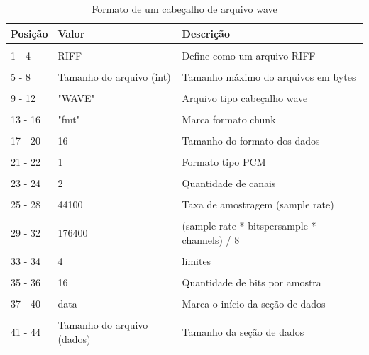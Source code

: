 \begin{table}[H]
\centering
\caption{Formato de um cabeçalho de arquivo wave}
\label{tab:app}
\smallskip
\begin{tabular}{|l|l|l|}
\hline
Posição & Valor & Descrição\\[0.5ex]
\hline
&&\\[-2ex]
1 - 4& RIFF & Define como um arquivo RIFF \\[0.5ex]
\hline
&&\\[-2ex]
5 - 8& Tamanho do arquivo (int) & Tamanho máximo do arquivos em bytes \\[0.5ex]
\hline
&&\\[-2ex]
9 - 12 & "WAVE" & Arquivo tipo cabeçalho wave\\[0.5ex]
\hline
&&\\[-2ex]
13 - 16& "fmt" & Marca formato chunk \\[0.5ex]
\hline
&&\\[-2ex]
17 - 20& 16& Tamanho do formato dos dados \\[0.5ex]
\hline
&&\\[-2ex]
21 - 22& 1& Formato tipo PCM\\[0.5ex]
\hline
&&\\[-2ex]
23 - 24& 2 & Quantidade de canais\\[0.5ex]
\hline
&&\\[-2ex]
25 - 28& 44100 & Taxa de amostragem (sample rate) \\[0.5ex]
\hline
&&\\[-2ex]
29 - 32& 176400& (sample rate * bitspersample * channels) / 8 \\[0.5ex]
\hline
&&\\[-2ex]
33 - 34&  4 & limites \\[0.5ex]
\hline
&&\\[-2ex]
35 - 36& 16 & Quantidade de bits por amostra \\[0.5ex]
\hline
&&\\[-2ex]
37 - 40& data & Marca o início da seção de dados \\[0.5ex]
\hline
&&\\[-2ex]
41 - 44& Tamanho do arquivo (dados) & Tamanho da seção de dados \\[0.5ex]
\hline
\end{tabular}
\end{table}



